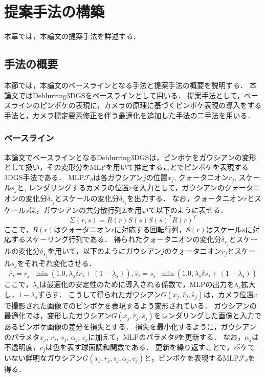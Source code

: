 \section{提案手法の構築}\label{sec:method_creation}
本章では，本論文の提案手法を詳述する．

\subsection{手法の概要}\label{subsec:method_outline}
本節では，本論文のベースラインとなる手法と提案手法の概要を説明する．
本論文ではDeblurring3DGS\cite{Deblurring3dgs}をベースラインとして用いる．
提案手法として，ベースラインのピンボケの表現に，カメラの原理に基づくピンボケ表現の導入をする手法と，カメラ標定要素修正を伴う最適化を追加した手法の二手法を用いる．
\subsubsection*{ベースライン}
本論文でベースラインとなるDeblurring3DGS\cite{Deblurring3dgs}は，ピンボケをガウシアンの変形として扱い，その変形分をMLPを用いて推定することでピンボケを表現する3DGS手法である．
MLP$\mathcal{F}_\theta$は各ガウシアン$j$の位置$x_j$, クォータニオン$r_j$, スケール$s_j$と, レンダリングするカメラの位置$v$を入力として，ガウシアンのクォータニオンの変化分$\delta_{r_j}$とスケールの変化分$\delta_{s_j}$を出力する．
なお，クォータニオン$r$とスケール$s$は，ガウシアンの共分散行列$\Sigma$を用いて以下のように表せる．
\begin{equation}
  \Sigma(r, s) = R(r)S(s){S(s)}^T{R(r)}^T
\end{equation}
ここで，$R(r)$はクォータニオン$r$に対応する回転行列，$S(r)$はスケール$s$に対応するスケーリング行列である\cite{rotation_quaternion}．
得られたクォータニオンの変化分$\delta_{r_j}$とスケールの変化分$\delta_{s_j}$を用いて，以下のようにガウシアン$j$のクォータニオン$r_j$とスケール$s_j$をそれぞれ変化させる．
\begin{equation}
	\hat{r}_j=r_j \cdot \min \left(1.0, \lambda_s \delta r_j+\left(1-\lambda_s\right)\right), 
	\hat{s}_j=s_j \cdot \min \left(1.0, \lambda_s \delta s_j+\left(1-\lambda_s\right)\right)
\end{equation}
ここで，$\lambda_s$は最適化の安定性のために導入される係数で，MLPの出力を$\lambda_s$拡大し，$1-\lambda_s$ずらす．
こうして得られたガウシアン$G(x_j, \hat{r}_j, \hat{s}_j)$は，カメラ位置$v$で撮影された画像でのピンボケを表現するよう変形されている．
ガウシアンの最適化では，変形したガウシアン$G(x_j, \hat{r}_j, \hat{s}_j)$をレンダリングした画像と入力であるピンボケ画像の差分を損失とする．
損失を最小化するように，ガウシアンのパラメタ$x_j$, $r_j$, $s_j$, $\alpha_j$, $c_j$に加えて，MLPのパラメタ$\theta$を更新する．
なお，$\alpha_j$は不透明度，$c_j$は色を表す球面調和関数である．
更新を繰り返すことで，ボケていない鮮明なガウシアン$G(x_j, r_j, s_j, \alpha_j, c_j)$と，ピンボケを表現するMLP$\mathcal{F}_\theta$を得る．


